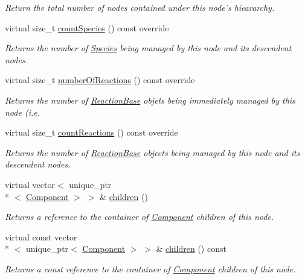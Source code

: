 \begin{DoxyCompactItemize}
\begin{DoxyCompactList}\small\item\em Return the total number of nodes contained under this node's hieararchy. \end{DoxyCompactList}\item 
virtual size\+\_\+t \hyperlink{classComposite_ad3162a869285627b04c5388dc28e2719}{count\+Species} () const override
\begin{DoxyCompactList}\small\item\em Returns the number of \hyperlink{classSpecies}{Species} being managed by this node and its descendent nodes. \end{DoxyCompactList}\item 
virtual size\+\_\+t \hyperlink{classComposite_aee77e531ab9ccb8dcea12a307bd75539}{number\+Of\+Reactions} () const override
\begin{DoxyCompactList}\small\item\em Returns the number of \hyperlink{classReactionBase}{Reaction\+Base} objets being immediately managed by this node (i.\+e. \end{DoxyCompactList}\item 
virtual size\+\_\+t \hyperlink{classComposite_a14108b9a4f9e903ba0fd9cc40fbbd8ae}{count\+Reactions} () const override
\begin{DoxyCompactList}\small\item\em Returns the number of \hyperlink{classReactionBase}{Reaction\+Base} objects being managed by this node and its descendent nodes. \end{DoxyCompactList}\item 
virtual vector$<$ unique\+\_\+ptr\\*
$<$ \hyperlink{classComponent}{Component} $>$ $>$ \& \hyperlink{classComposite_adc22f790bd1f78a4a195a61ae60c0965}{children} ()
\begin{DoxyCompactList}\small\item\em Returns a reference to the container of \hyperlink{classComponent}{Component} children of this node. \end{DoxyCompactList}\item 
virtual const vector\\*
$<$ unique\+\_\+ptr$<$ \hyperlink{classComponent}{Component} $>$ $>$ \& \hyperlink{classComposite_a7824aae77c582d72a2e8b403f2636385}{children} () const 
\begin{DoxyCompactList}\small\item\em Returns a const reference to the container of \hyperlink{classComponent}{Component} children of this node. \end{DoxyCompactList}\item 

\end{DoxyCompactItemize}
